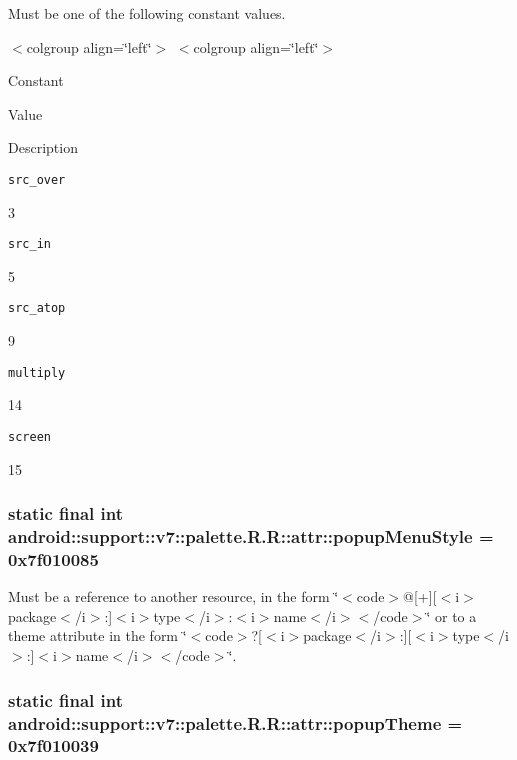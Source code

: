 Must be one of the following constant values. \begin{TabularC}{0}
\hline
\end{TabularC}
$<$colgroup align=\char`\"{}left\char`\"{}$>$ $<$colgroup align=\char`\"{}left\char`\"{}$>$ 

Constant

Value

Description 

{\tt src\_\-over}

3

{\tt src\_\-in}

5

{\tt src\_\-atop}

9

{\tt multiply}

14

{\tt screen}

15\hypertarget{classandroid_1_1support_1_1v7_1_1palette_1_1_r_1_1attr_72263a897690bde19e41d01ee427a4c7}{
\subsubsection[{popupMenuStyle}]{\setlength{\rightskip}{0pt plus 5cm}static final int android::support::v7::palette.R.R::attr::popupMenuStyle = 0x7f010085}}
\label{classandroid_1_1support_1_1v7_1_1palette_1_1_r_1_1attr_72263a897690bde19e41d01ee427a4c7}


Must be a reference to another resource, in the form \char`\"{}$<$code$>$@\mbox{[}+\mbox{]}\mbox{[}$<$i$>$package$<$/i$>$:\mbox{]}$<$i$>$type$<$/i$>$:$<$i$>$name$<$/i$>$$<$/code$>$\char`\"{} or to a theme attribute in the form \char`\"{}$<$code$>$?\mbox{[}$<$i$>$package$<$/i$>$:\mbox{]}\mbox{[}$<$i$>$type$<$/i$>$:\mbox{]}$<$i$>$name$<$/i$>$$<$/code$>$\char`\"{}. \hypertarget{classandroid_1_1support_1_1v7_1_1palette_1_1_r_1_1attr_c0a024405af51725edd3bf49b2b56c13}{
\subsubsection[{popupTheme}]{\setlength{\rightskip}{0pt plus 5cm}static final int android::support::v7::palette.R.R::attr::popupTheme = 0x7f010039}}
\label{classandroid_1_1support_1_1v7_1_1palette_1_1_r_1_1attr_c0a024405af51725edd3bf49b2b56c13}


